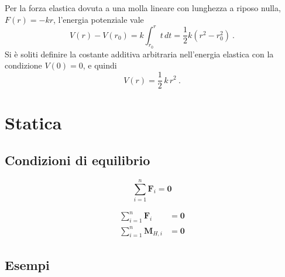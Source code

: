 \begin{example} Per la forza elastica dovuta a una molla lineare con lunghezza a riposo nulla, $F(r) = - k r$, l'energia potenziale vale
    \begin{equation}
        V(r) - V(r_0) = k \int_{r_0}^{r} t \, dt = \dfrac{1}{2} k \left( r^2 - r_0^2 \right) \ .
    \end{equation}
Si è soliti definire la costante additiva arbitraria nell'energia elastica con la condizione $V(0) = 0$, e quindi
    \begin{equation}
        V(r) = \dfrac{1}{2} \, k \, r^2 \ .
    \end{equation}
\end{example}

\chapter{Statica}

\section{Condizioni di equilibrio}
\begin{definition}
    \begin{equation}
        \sum_{i=1}^{n} \mathbf{F}_i = \mathbf{0}
    \end{equation}
\end{definition}

\begin{definition}
    \begin{equation}
    \begin{aligned}
        \sum_{i=1}^{n} \mathbf{F}_i & = \mathbf{0} \\
        \sum_{i=1}^{n} \mathbf{M}_{H,i} & = \mathbf{0}
    \end{aligned}
    \end{equation}
\end{definition}

\section{Esempi}


